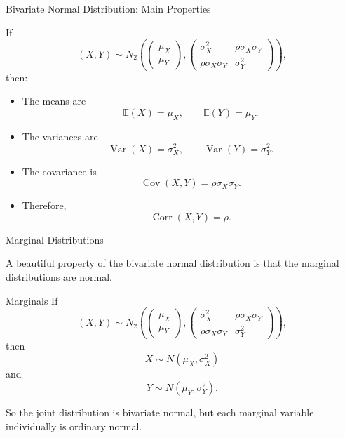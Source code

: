 \begin{frame}{Bivariate Normal Distribution: Main Properties}

If
\[
(X,Y)
\sim
N_2
\left(
\begin{pmatrix}
\mu_X\\
\mu_Y
\end{pmatrix},
\begin{pmatrix}
\sigma_X^2 & \rho\sigma_X\sigma_Y\\
\rho\sigma_X\sigma_Y & \sigma_Y^2
\end{pmatrix}
\right),
\]
then:

\vspace{0.2cm}

\begin{itemize}
    \item The means are
    \[
    \mathbb{E}(X)=\mu_X,
    \qquad
    \mathbb{E}(Y)=\mu_Y.
    \]

    \item The variances are
    \[
    \operatorname{Var}(X)=\sigma_X^2,
    \qquad
    \operatorname{Var}(Y)=\sigma_Y^2.
    \]

    \item The covariance is
    \[
    \operatorname{Cov}(X,Y)=\rho\sigma_X\sigma_Y.
    \]

    \item Therefore,
    \[
    \operatorname{Corr}(X,Y)=\rho.
    \]
\end{itemize}

\end{frame}





\begin{frame}{Marginal Distributions}

A beautiful property of the bivariate normal distribution is that the marginal distributions are normal.

\begin{keybox}{Marginals}
If
\[
(X,Y)
\sim
N_2
\left(
\begin{pmatrix}
\mu_X\\
\mu_Y
\end{pmatrix},
\begin{pmatrix}
\sigma_X^2 & \rho\sigma_X\sigma_Y\\
\rho\sigma_X\sigma_Y & \sigma_Y^2
\end{pmatrix}
\right),
\]
then
\[
\boxed{
X\sim N(\mu_X,\sigma_X^2)
}
\]
and
\[
\boxed{
Y\sim N(\mu_Y,\sigma_Y^2).
}
\]
\end{keybox}

\vspace{0.25cm}

So the joint distribution is bivariate normal, but each marginal variable individually is ordinary normal.

\end{frame}





